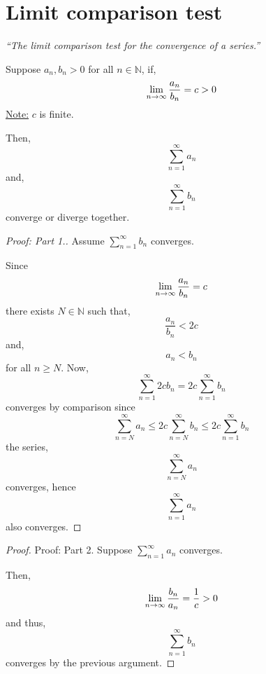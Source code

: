 \documentclass[12pt]{report}
\begin{document}
    \section{Limit comparison test}
    \textit{``The limit comparison test for the convergence of a series.''} \vspace{3mm}
    \begin{theorem}
        Suppose \(a_n, b_n > 0\) for all \(n \in \mathbb{N}\), if,
        \[\lim_{n \to \infty} \frac{a_n}{b_n} = c > 0 \]
        \underline{Note:} \(c\) is finite.
        
        Then,
        \[\sum^\infty_{n=1} a_n\]
        and,
        \[\sum^\infty_{n=1} b_n\]
        converge or diverge together.
    \end{theorem}
    \begin{proof}[Proof: Part \textnormal{1.}]
        Assume \(\sum^\infty_{n=1} b_n\) converges. 
        
        Since
        \[\lim_{n \to \infty} \frac{a_n}{b_n} = c\]
        there exists \(N \in \mathbb{N}\) such that,
        \[\frac{a_n}{b_n} < 2c\]
        and,
        \[a_n < b_n\]
        for all \(n \geq N\). Now,
        \[\sum^\infty_{n=1} 2c b_n = 2c \sum^\infty_{n=1} b_n \]
        converges by comparison since
        \[\sum^\infty_{n=N} a_n \leq 2c \sum^\infty_{n=N} b_n \leq 2c \sum^\infty_{n=1} b_n\]
        the series,
        \[\sum^\infty_{n=N} a_n\]
         converges, hence 
         \[\sum^\infty_{n=1} a_n\] 
         also converges.
    \end{proof}
    \begin{proof}Proof: Part \textnormal{2.}
        Suppose \(\sum^\infty_{n=1} a_n\) converges.

        Then,
        \[\lim_{n \to \infty} \frac{b_n}{a_n} = \frac{1}{c} > 0\]
        and thus,
        \[\sum^\infty_{n=1} b_n\]
        converges by the previous argument.
    \end{proof}
\end{document}
